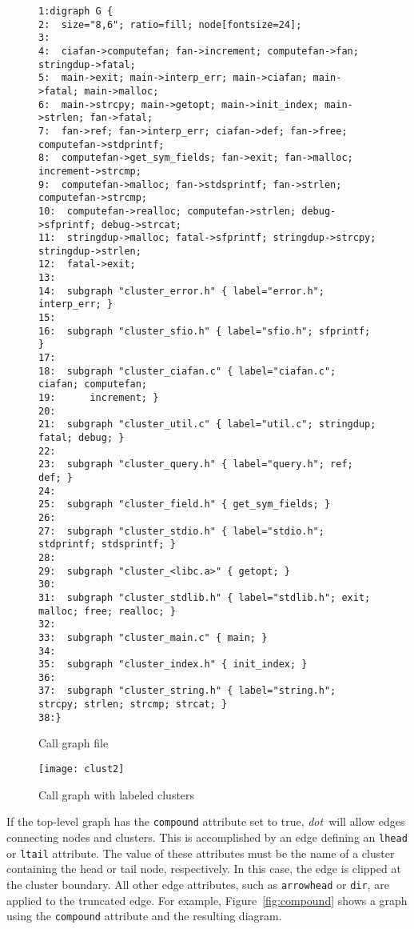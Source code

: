 \documentclass[11pt]{article}
\def\dot{{\it dot}}
\begin{document}
{\begin{figure}[p]
\footnotesize
\begin{verbatim}
1:digraph G {
2:  size="8,6"; ratio=fill; node[fontsize=24];
3:
4:  ciafan->computefan; fan->increment; computefan->fan; stringdup->fatal;
5:  main->exit; main->interp_err; main->ciafan; main->fatal; main->malloc;
6:  main->strcpy; main->getopt; main->init_index; main->strlen; fan->fatal;
7:  fan->ref; fan->interp_err; ciafan->def; fan->free; computefan->stdprintf;
8:  computefan->get_sym_fields; fan->exit; fan->malloc; increment->strcmp;
9:  computefan->malloc; fan->stdsprintf; fan->strlen; computefan->strcmp;
10:  computefan->realloc; computefan->strlen; debug->sfprintf; debug->strcat;
11:  stringdup->malloc; fatal->sfprintf; stringdup->strcpy; stringdup->strlen;
12:  fatal->exit;
13:
14:  subgraph "cluster_error.h" { label="error.h"; interp_err; }
15:
16:  subgraph "cluster_sfio.h" { label="sfio.h"; sfprintf; }
17:
18:  subgraph "cluster_ciafan.c" { label="ciafan.c"; ciafan; computefan;
19:      increment; }
20:
21:  subgraph "cluster_util.c" { label="util.c"; stringdup; fatal; debug; }
22:
23:  subgraph "cluster_query.h" { label="query.h"; ref; def; }
24:
25:  subgraph "cluster_field.h" { get_sym_fields; }
26:
27:  subgraph "cluster_stdio.h" { label="stdio.h"; stdprintf; stdsprintf; }
28:
29:  subgraph "cluster_<libc.a>" { getopt; }
30:
31:  subgraph "cluster_stdlib.h" { label="stdlib.h"; exit; malloc; free; realloc; }
32:
33:  subgraph "cluster_main.c" { main; }
34:
35:  subgraph "cluster_index.h" { init_index; }
36:
37:  subgraph "cluster_string.h" { label="string.h"; strcpy; strlen; strcmp; strcat; }
38:}
\end{verbatim}
\caption{Call graph file}
\label{fig:clust2}
\end{figure}

\begin{figure}[p]
	\centerline {
		\texttt{[image: clust2]}
	}
    \caption{Call graph with labeled clusters}
	\label{fig:callgraph}
\end{figure}

If the top-level graph has the {\tt compound} attribute set to true,
\dot\ will allow edges connecting nodes and clusters. This is accomplished
by an edge defining an {\tt lhead} or {\tt ltail} attribute. The
value of these attributes must be the name of a cluster containing the
head or tail node, respectively. In this case, the edge is clipped at
the cluster boundary. All other edge attributes, such as {\tt arrowhead}
or {\tt dir}, are applied to the truncated edge. For example,
Figure~\ref{fig:compound} shows a graph using the {\tt compound} attribute
and the resulting diagram.

}
\end{document}
